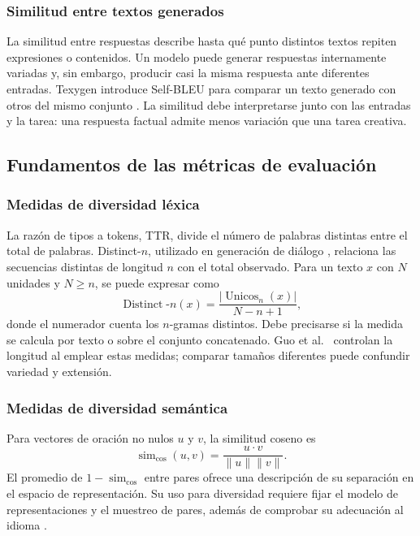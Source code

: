 \documentclass[12pt,letterpaper]{article}
\begin{document}
\subsubsection{Similitud entre textos generados}

La similitud entre respuestas describe hasta qué punto distintos textos
repiten expresiones o contenidos. Un modelo puede generar respuestas
internamente variadas y, sin embargo, producir casi la misma respuesta
ante diferentes entradas. Texygen introduce Self-BLEU para comparar un
texto generado con otros del mismo conjunto \cite{zhu2018texygen}.
La similitud debe interpretarse junto con las entradas y la tarea: una
respuesta factual admite menos variación que una tarea creativa.

\subsection{Fundamentos de las métricas de evaluación}

\subsubsection{Medidas de diversidad léxica}

La razón de tipos a tokens, TTR, divide el número de palabras distintas
entre el total de palabras. Distinct-\(n\), utilizado en generación de
diálogo \cite{li2016}, relaciona las secuencias distintas de longitud
\(n\) con el total observado. Para un texto \(x\) con \(N\) unidades y
\(N\geq n\), se puede expresar como
\begin{equation}
    \operatorname{Distinct}\text{-}n(x)
    =\frac{|\operatorname{Unicos}_n(x)|}{N-n+1},
\end{equation}
donde el numerador cuenta los \(n\)-gramas distintos. Debe precisarse si
la medida se calcula por texto o sobre el conjunto concatenado. Guo
et al.\ \cite{guo2024} controlan la longitud al emplear estas medidas;
comparar tamaños diferentes puede confundir variedad y extensión.

\subsubsection{Medidas de diversidad semántica}

Para vectores de oración no nulos \(u\) y \(v\), la similitud coseno es
\begin{equation}
    \operatorname{sim}_{\cos}(u,v)
    =\frac{u\cdot v}{\lVert u\rVert\lVert v\rVert}.
\end{equation}
El promedio de \(1-\operatorname{sim}_{\cos}\) entre pares ofrece una
descripción de su separación en el espacio de representación. Su uso
para diversidad requiere fijar el modelo de representaciones y el
muestreo de pares, además de comprobar su adecuación al idioma
\cite{reimers2019,guo2024}.
\end{document}
